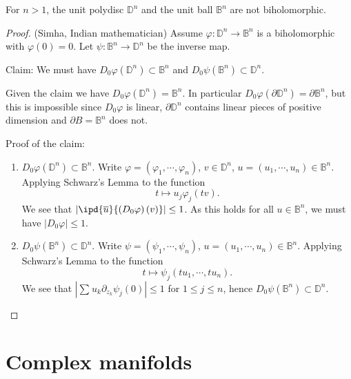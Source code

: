 \begin{theorem}[Poincar\'{e}]
 For $n>1$, the unit polydisc $\mathbb{D}^{n}$ and the unit ball $\mathbb{B}^{n}$ are not biholomorphic. 
\end{theorem}
\begin{proof}
  (Simha, Indian mathematician) Assume $\varphi:\mathbb{D}^{n}\to \mathbb{B}^{n}$ is a biholomorphic with $\varphi(0)=0$. Let $\psi:\mathbb{B}^{n}\to \mathbb{D}^{n}$ be the inverse map. 

  Claim: We must have $D_0\varphi(\mathbb{D}^{n})\subset \mathbb{B}^{n}$ and $D_0 \psi(\mathbb{B}^{n})\subset \mathbb{D}^{n}$. 
  
  Given the claim we have $D_0\varphi(\mathbb{D}^{n})=\mathbb{B}^{n}$. In particular $D_0\varphi(\partial \mathbb{D}^{n})=\partial \mathbb{B}^{n}$, but this is impossible since $D_0\varphi$ is linear, $\partial \mathbb{D}^{n}$ contains linear pieces of positive dimension and $\partial B=\mathbb{B}^{n}$ does not.

  Proof of the claim: 
  \begin{enumerate}
    \item $D_0\varphi(\mathbb{D}^{n})\subset  \mathbb{B}^{n}$. Write $\varphi=\left( \varphi_1,\cdots ,\varphi_n \right) $, $v\in \mathbb{D}^{n}$, $u=(u_1,\cdots ,u_n)\in  \mathbb{B}^{n}$. Applying Schwarz's Lemma to the function
      \[
	t\mapsto u_j\varphi_{j}(tv).
      \] 
      We see that $|\ipd{\overline{u}}{\left( D_0\varphi \right)(v) }|\le 1$. As this holds for all $u \in \mathbb{B}^{n}$, we must have $|D_0 \varphi|\le 1$.
    \item $D_0 \psi(\mathbb{B}^{n})\subset \mathbb{D}^{n}$. Write $\psi=\left( \psi_1,\cdots ,\psi_n \right) $, $u=\left( u_1,\cdots ,u_n \right) \in \mathbb{B}^{n}$. Applying Schwarz's Lemma to the function 
      \[
	t\mapsto \psi_j\left( tu_1,\cdots ,tu_n \right) .
      \] 
      We see that $|\sum_{}^{} u_k \partial_{z_k}\psi_j(0)|\le 1$ for $1\le j\le n$, hence $D_0\psi(\mathbb{B}^{n})\subset \mathbb{D}^{n}$.
  \end{enumerate}
\end{proof}

\section{Complex manifolds}
